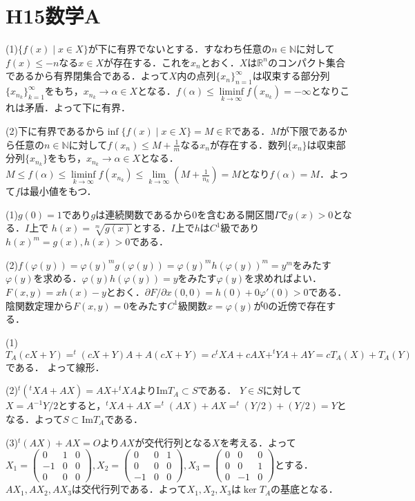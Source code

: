 \documentclass[
		book,
		head_space=20mm,
		foot_space=20mm,
		gutter=10mm,
		line_length=190mm
]{jlreq}
\begin{document}
\section{H15数学A}
(1)$\{ f(x) \mid x\in X\}$が下に有界でないとする．すなわち任意の$n \in \mathbb{N}$に対して$f(x)\le -n$なる$x \in X$が存在する．これを$x_n$とおく．$X$は$\mathbb{R}^n$のコンパクト集合であるから有界閉集合である．よって$X$内の点列$\{ x_n\}_{n=1}^\infty$は収束する部分列$\{ x_{n_k}\}_{k=1}^\infty$をもち，$x_{n_k}\rightarrow \alpha \in X$となる．$f(\alpha)\le \liminf\limits_{k\rightarrow \infty} f(x_{n_k})=-\infty$となりこれは矛盾．よって下に有界．

(2)下に有界であるから$\inf\{ f(x)\mid x\in X\}=M\in \mathbb{R}$である．$M$が下限であるから任意の$n\in \mathbb{N}$に対して$f(x_n)\le M+\frac{1}{m}$なる$x_n$が存在する．数列$\{ x_n\}$は収束部分列$\{ x_{n_k}\}$をもち，$x_{n_k}\rightarrow \alpha \in X$となる．
$M\le f(\alpha)\le \liminf\limits_{k\rightarrow \infty} f(x_{n_k})\le \lim\limits_{k\to \infty} (M+\frac{1}{n_k})=M$となり$f(\alpha)=M$．よって$f$は最小値をもつ．

(1)$g(0)=1$であり$g$は連続関数であるから$0$を含むある開区間$I$で$g(x)>0$となる．$I$上で
$h(x)=\sqrt[m]{g(x)}$とする．$I$上で$h$は$C^1$級であり$h(x)^m=g(x),h(x)>0$である．

(2)$f(\varphi(y))=\varphi(y)^mg(\varphi(y))=\varphi(y)^mh(\varphi(y))^m=y^m$をみたす$\varphi(y)$を求める．$\varphi(y)h(\varphi(y))=y$をみたす$\varphi(y)$を求めればよい．$F(x,y)=xh(x)-y$とおく．$\partial F/\partial x(0,0)=h(0)+0\varphi'(0)>0$である．陰関数定理から$F(x,y)=0$をみたす$C^1$級関数$x=\varphi(y)$が$0$の近傍で存在する．

(1)$T_A(cX+Y)=^t(cX+Y)A+A(cX+Y)=c^tXA+cAX+^tYA+AY=cT_A(X)+T_A(Y)$である．
よって線形．

(2)$^t(^tXA+AX)=AX+^tXA$より$\mathrm{Im}T_A\subset S$である．
$Y \in S$に対して$X=A^{-1}Y/2$とすると，$^tXA+AX=^t(AX)+AX=^t(Y/2)+(Y/2)=Y$となる．よって$S\subset \mathrm{Im}T_A$である．

(3)$^t(AX)+AX=O$より$AX$が交代行列となる$X$を考える．よって$X_1=\begin{pmatrix}
	0 & 1 & 0\\
	-1 & 0 & 0\\
	0 & 0 & 0
\end{pmatrix},X_2=\begin{pmatrix}
	0 & 0 & 1\\
	0 & 0 & 0\\
	-1 & 0 & 0
	\end{pmatrix},X_3=\begin{pmatrix}
	0 & 0 & 0\\
	0 & 0 & 1\\
	0 & -1 & 0
\end{pmatrix}$とする．$AX_1,AX_2,AX_3$は交代行列である．よって$X_1,X_2,X_3$は$\ker T_A$の基底となる．
\end{document}
